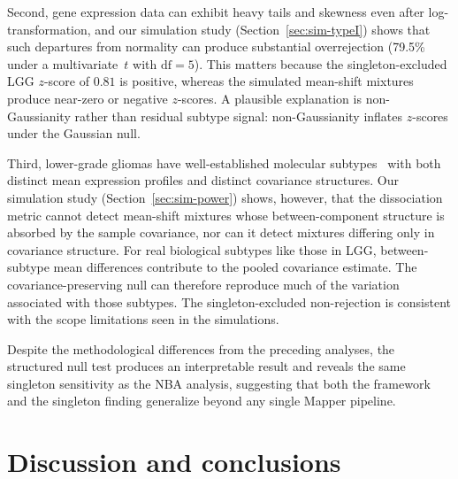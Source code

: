 \documentclass[hidelinks]{siamart251216}
\newcommand{\singletonExcludedLGGz}{0.81}
\begin{document}
Second, gene expression data can exhibit heavy tails and skewness even
after log-transformation, and our simulation study
(Section~\ref{sec:sim-typeI}) shows that such departures from normality
can produce substantial overrejection (79.5\% under a multivariate~$t$
with $\mathrm{df} = 5$).  This matters because the singleton-excluded
LGG $z$-score of $\singletonExcludedLGGz$ is positive, whereas the simulated mean-shift
mixtures produce near-zero or negative $z$-scores.  A plausible
explanation is non-Gaussianity rather than residual subtype signal:
non-Gaussianity inflates $z$-scores under the Gaussian null.

Third, lower-grade gliomas have well-established molecular
subtypes~\citep{Cancer2015lgg} with both distinct mean expression
profiles and distinct covariance structures.  Our simulation study
(Section~\ref{sec:sim-power}) shows, however, that the dissociation
metric cannot detect mean-shift mixtures whose between-component
structure is absorbed by the sample covariance, nor can it detect
mixtures differing only in covariance structure.  For real biological
subtypes like those in LGG, between-subtype mean differences contribute
to the pooled covariance estimate.  The covariance-preserving null can
therefore reproduce much of the variation associated with those
subtypes.  The singleton-excluded non-rejection is consistent with the
scope limitations seen in the simulations.

Despite the methodological differences from the preceding analyses, the
structured null test produces an interpretable result and reveals the
same singleton sensitivity as the NBA analysis, suggesting that both the
framework and the singleton finding generalize beyond any single Mapper
pipeline.





\section{Discussion and conclusions}\label{sec:discussion}
\end{document}
